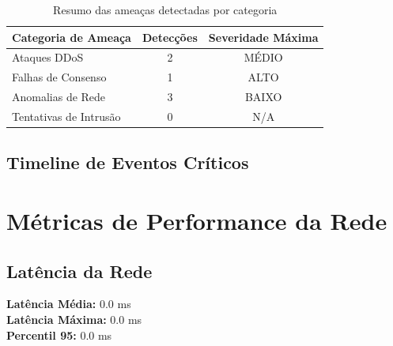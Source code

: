 \documentclass[12pt,a4paper]{article}
\begin{document}
\begin{table}[h!]
\centering
\begin{tabular}{@{}lcc@{}}
\toprule
\textbf{Categoria de Ameaça} & \textbf{Detecções} & \textbf{Severidade Máxima} \\
\midrule
Ataques DDoS & 2 & \textcolor{aeonblue}{MÉDIO} \\
Falhas de Consenso & 1 & \textcolor{warning}{ALTO} \\
Anomalias de Rede & 3 & \textcolor{success}{BAIXO} \\
Tentativas de Intrusão & 0 & \textcolor{aeongray}{N/A} \\
\bottomrule
\end{tabular}
\caption{Resumo das ameaças detectadas por categoria}
\end{table}

\subsection{Timeline de Eventos Críticos}

\begin{center}
\end{center}

\section{Métricas de Performance da Rede}

\subsection{Latência da Rede}

\textbf{Latência Média:} 0.0 ms\\
\textbf{Latência Máxima:} 0.0 ms\\
\textbf{Percentil 95:} 0.0 ms

\begin{center}
\end{center}
\end{document}
